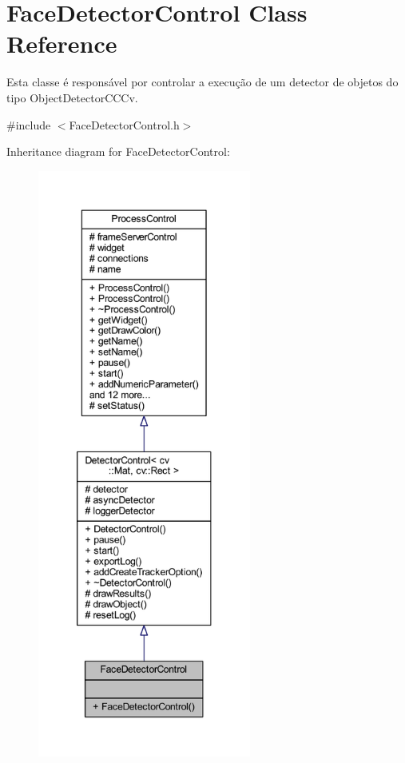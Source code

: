 \hypertarget{class_face_detector_control}{}\section{Face\+Detector\+Control Class Reference}
\label{class_face_detector_control}


Esta classe é responsável por controlar a execução de um detector de objetos do tipo Object\+Detector\+C\+C\+Cv.  




{\ttfamily \#include $<$Face\+Detector\+Control.\+h$>$}



Inheritance diagram for Face\+Detector\+Control\+:
\nopagebreak
\begin{figure}[H]
\begin{center}
\leavevmode
\includegraphics[height=550pt]{class_face_detector_control__inherit__graph}
\end{center}
\end{figure}


